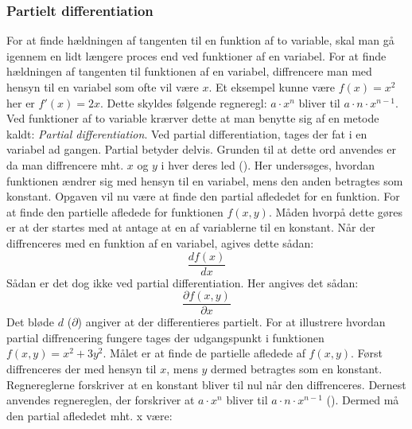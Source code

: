 \subsubsection{Partielt differentiation}\label{sec:PartieltDifferentiation}
For at finde hældningen af tangenten til en funktion af to variable, skal man gå igennem en lidt længere proces end ved funktioner af en variabel. For at finde hældningen af tangenten til funktionen af en variabel, diffrencere man med hensyn til en variabel som ofte vil være $x$. Et eksempel kunne være $f(x) = x^2$ her er $f'(x) = 2x$. Dette skyldes følgende regneregl: $a \cdot x^n$ bliver til $a \cdot n \cdot x^{n-1}$. \\ Ved funktioner af to variable krærver dette at man benytte sig af en metode kaldt: \textit{Partial differentiation}. Ved partial differentiation, tages der fat i en variabel ad gangen. Partial betyder delvis. Grunden til at dette ord anvendes er da man diffrencere mht. $x$ og $y$ i hver deres led (\cite[4]{Larsen2016}). Her undersøges, hvordan funktionen ændrer sig med hensyn til en variabel, mens den anden betragtes som konstant. Opgaven vil nu være at finde den partial aflededet for en funktion. For at finde den partielle afledede for funktionen $f(x,y)$. Måden hvorpå dette gøres er at der startes med at antage at en af variablerne til en konstant. Når der diffrenceres med en funktion af en variabel, agives dette sådan: \begin{equation}\frac{d f(x)}{d x}\end{equation} Sådan er det dog ikke ved partial differentiation. Her angives det sådan: \begin{equation}\frac{\partial f(x,y)}{\partial x}\end{equation} 
Det bløde $d$ (\begin{math}\partial\end{math}) angiver at der differentieres partielt. For at illustrere hvordan partial diffrencering fungere tages der udgangspunkt i funktionen $f(x,y) = x^2 + 3y^2$. Målet er at finde de partielle afledede af $f(x,y)$. Først diffrenceres der med hensyn til $x$, mens $y$ dermed betragtes som en konstant. Regnereglerne forskriver at en konstant bliver til nul når den diffrenceres. Dernest anvendes regnereglen, der forskriver at \begin{math}a \cdot x^n\end{math} bliver til \begin{math}a \cdot n \cdot x^{n-1}\end{math} (\cite[14]{Pihl2019}). Dermed må den partial aflededet mht. x være: 
